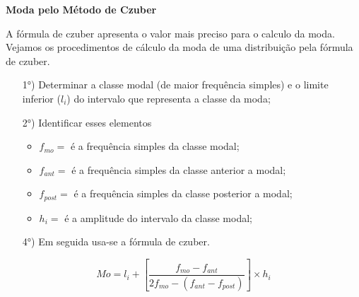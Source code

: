 \textbf{Moda pelo Método de Czuber}
\vskip0.3cm

A fórmula de czuber apresenta o valor mais preciso para o calculo da moda. Vejamos os procedimentos
de cálculo da moda de uma distribuição pela fórmula de czuber.


\begin{enumerate}
\item [{1°)}] Determinar a classe modal (de maior frequência simples) e o limite inferior ($l_{i}$) do intervalo que representa a classe da moda;
\item [{2°)}] Identificar esses elementos
\begin{itemize}
   \item $f_{mo}=$ é a frequência simples da classe modal;
   \item $f_{ant}=$ é a frequência simples da classe anterior a modal;
   \item $f_{post}=$ é a frequência simples da classe posterior a modal;
   \item $h_{i}=$ é a amplitude do intervalo da classe modal;
 \end{itemize}
\item [{4°)}] Em seguida usa-se a fórmula de czuber.
\end{enumerate}

\begin{equation}\label{}
    Mo=l_{i}+\left[\frac{f_{mo}-f_{ant}}{2f_{mo}-(f_{ant}-f_{post})}\right]\times h_{i}
\end{equation}








